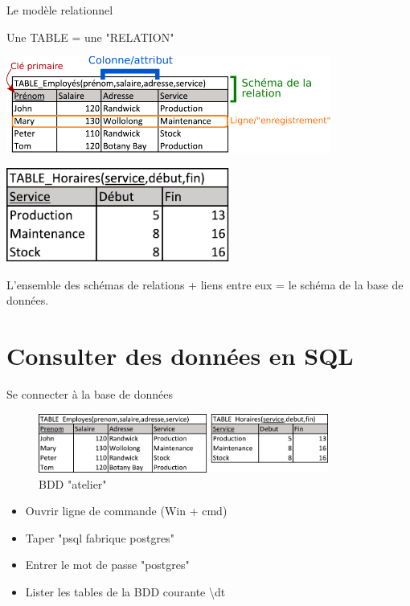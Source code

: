 \documentclass[xetex,dvipsnames]{beamer}
\begin{document}
\begin{frame}[t]{Le modèle relationnel}
		\begin{center}
			Une TABLE = une "RELATION"
	    \end{center}
			\vspace{0.3em}
	    	\includegraphics[width=0.8\textwidth]{./figures/relation.pdf}
	    	\vspace{0.3em}
	    	\vspace*{0.3em}
\begin{flushright}
	    	\includegraphics[width=0.55\textwidth]{./figures/relation2.pdf}
\end{flushright}
 			\begin{center}
			L'ensemble des schémas de relations + liens entre eux = le schéma de la base de données.
	    \end{center}
\end{frame}


\section{Consulter des données en SQL}
\begin{frame}{Se connecter à la base de données}
 	\begin{center}
	    	\begin{figure}
	    	\includegraphics[width=0.85\textwidth]{./figures/BDDatelier.pdf}
	    	\caption{BDD "atelier"}
	    	\end{figure}
	\end{center}
	\begin{itemize}
		\item Ouvrir ligne de commande (Win + cmd)
		\item Taper "psql fabrique postgres"
		\item Entrer le mot de passe "postgres"
		\item Lister les tables de la BDD courante \textbackslash dt
	\end{itemize}		
\end{frame}
\end{document}
